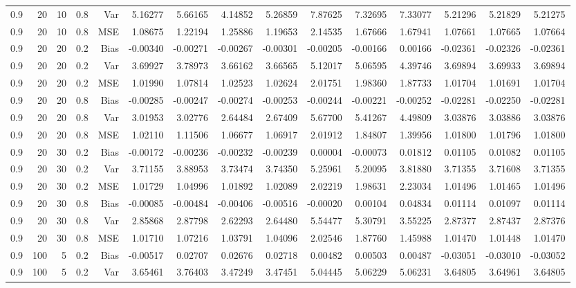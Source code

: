 \begin{table}[!htbp]
\begin{tabular}{lrrrrrrrrrrrrrr}
0.9 &  20 & 10 & 0.8 & Var & 5.16277 & 5.66165 & 4.14852 & 5.26859 & 7.87625 & 7.32695 & 7.33077 & 5.21296 & 5.21829 & 5.21275 \\
0.9 &  20 & 10 & 0.8 & MSE & 1.08675 & 1.22194 & 1.25886 & 1.19653 & 2.14535 & 1.67666 & 1.67941 & 1.07661 & 1.07665 & 1.07664 \\
0.9 &  20 & 20 & 0.2 & Bias & -0.00340 & -0.00271 & -0.00267 & -0.00301 & -0.00205 & -0.00166 & 0.00166 & -0.02361 & -0.02326 & -0.02361 \\
0.9 &  20 & 20 & 0.2 & Var & 3.69927 & 3.78973 & 3.66162 & 3.66565 & 5.12017 & 5.06595 & 4.39746 & 3.69894 & 3.69933 & 3.69894 \\
0.9 &  20 & 20 & 0.2 & MSE & 1.01990 & 1.07814 & 1.02523 & 1.02624 & 2.01751 & 1.98360 & 1.87733 & 1.01704 & 1.01691 & 1.01704 \\
0.9 &  20 & 20 & 0.8 & Bias & -0.00285 & -0.00247 & -0.00274 & -0.00253 & -0.00244 & -0.00221 & -0.00252 & -0.02281 & -0.02250 & -0.02281 \\
0.9 &  20 & 20 & 0.8 & Var & 3.01953 & 3.02776 & 2.64484 & 2.67409 & 5.67700 & 5.41267 & 4.49809 & 3.03876 & 3.03886 & 3.03876 \\
0.9 &  20 & 20 & 0.8 & MSE & 1.02110 & 1.11506 & 1.06677 & 1.06917 & 2.01912 & 1.84807 & 1.39956 & 1.01800 & 1.01796 & 1.01800 \\
0.9 &  20 & 30 & 0.2 & Bias & -0.00172 & -0.00236 & -0.00232 & -0.00239 & 0.00004 & -0.00073 & 0.01812 & 0.01105 & 0.01082 & 0.01105 \\
0.9 &  20 & 30 & 0.2 & Var & 3.71155 & 3.88953 & 3.73474 & 3.74350 & 5.25961 & 5.20095 & 3.81880 & 3.71355 & 3.71608 & 3.71355 \\
0.9 &  20 & 30 & 0.2 & MSE & 1.01729 & 1.04996 & 1.01892 & 1.02089 & 2.02219 & 1.98631 & 2.23034 & 1.01496 & 1.01465 & 1.01496 \\
0.9 &  20 & 30 & 0.8 & Bias & -0.00085 & -0.00484 & -0.00406 & -0.00516 & -0.00020 & 0.00104 & 0.04834 & 0.01114 & 0.01097 & 0.01114 \\
0.9 &  20 & 30 & 0.8 & Var & 2.85868 & 2.87798 & 2.62293 & 2.64480 & 5.54477 & 5.30791 & 3.55225 & 2.87377 & 2.87437 & 2.87376 \\
0.9 &  20 & 30 & 0.8 & MSE & 1.01710 & 1.07216 & 1.03791 & 1.04096 & 2.02546 & 1.87760 & 1.45988 & 1.01470 & 1.01448 & 1.01470 \\
0.9 & 100 &  5 & 0.2 & Bias & -0.00517 & 0.02707 & 0.02676 & 0.02718 & 0.00482 & 0.00503 & 0.00487 & -0.03051 & -0.03010 & -0.03052 \\
0.9 & 100 &  5 & 0.2 & Var & 3.65461 & 3.76403 & 3.47249 & 3.47451 & 5.04445 & 5.06229 & 5.06231 & 3.64805 & 3.64961 & 3.64805 \\

\end{tabular}
\end{table}
